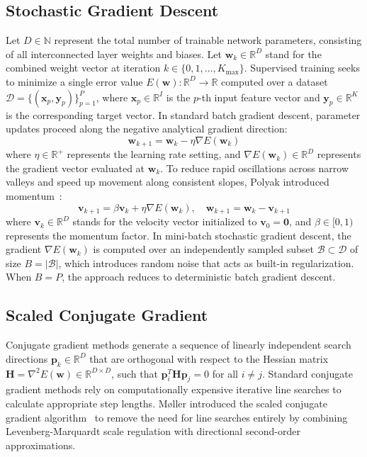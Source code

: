 \documentclass[conference,10pt]{IEEEtran}
\begin{document}
\subsection{Stochastic Gradient Descent}
Let $D \in \mathbb{N}$ represent the total number of trainable network parameters, consisting of all interconnected layer weights and biases. Let $\mathbf{w}_k \in \mathbb{R}^D$ stand for the combined weight vector at iteration $k \in \{0, 1, \dots, K_{\max}\}$. Supervised training seeks to minimize a single error value $E(\mathbf{w}): \mathbb{R}^D \to \mathbb{R}$ computed over a dataset $\mathcal{D} = \{(\mathbf{x}_p, \mathbf{y}_p)\}_{p=1}^P$, where $\mathbf{x}_p \in \mathbb{R}^I$ is the $p$-th input feature vector and $\mathbf{y}_p \in \mathbb{R}^K$ is the corresponding target vector. In standard batch gradient descent, parameter updates proceed along the negative analytical gradient direction:
\begin{equation}
\mathbf{w}_{k+1} = \mathbf{w}_k - \eta \nabla E(\mathbf{w}_k)
\end{equation}
where $\eta \in \mathbb{R}^+$ represents the learning rate setting, and $\nabla E(\mathbf{w}_k) \in \mathbb{R}^D$ represents the gradient vector evaluated at $\mathbf{w}_k$. To reduce rapid oscillations across narrow valleys and speed up movement along consistent slopes, Polyak introduced momentum~\cite{polyak1964}:
\begin{equation}
\mathbf{v}_{k+1} = \beta \mathbf{v}_k + \eta \nabla E(\mathbf{w}_k), \quad \mathbf{w}_{k+1} = \mathbf{w}_k - \mathbf{v}_{k+1}
\end{equation}
where $\mathbf{v}_k \in \mathbb{R}^D$ stands for the velocity vector initialized to $\mathbf{v}_0 = \mathbf{0}$, and $\beta \in [0, 1)$ represents the momentum factor. In mini-batch stochastic gradient descent, the gradient $\nabla E(\mathbf{w}_k)$ is computed over an independently sampled subset $\mathcal{B} \subset \mathcal{D}$ of size $B = |\mathcal{B}|$, which introduces random noise that acts as built-in regularization. When $B = P$, the approach reduces to deterministic batch gradient descent.

\subsection{Scaled Conjugate Gradient}
Conjugate gradient methods generate a sequence of linearly independent search directions $\mathbf{p}_k \in \mathbb{R}^D$ that are orthogonal with respect to the Hessian matrix $\mathbf{H} = \nabla^2 E(\mathbf{w}) \in \mathbb{R}^{D \times D}$, such that $\mathbf{p}_i^T \mathbf{H} \mathbf{p}_j = 0$ for all $i \ne j$. Standard conjugate gradient methods rely on computationally expensive iterative line searches to calculate appropriate step lengths. M\o{}ller introduced the scaled conjugate gradient algorithm~\cite{moller1993} to remove the need for line searches entirely by combining Levenberg-Marquardt scale regulation with directional second-order approximations.
\end{document}
